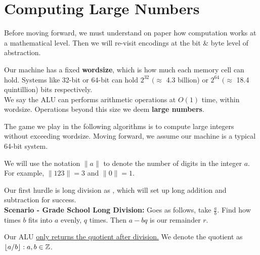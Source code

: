 \section{Computing Large Numbers}
\noindent
Before moving forward, we must understand on paper how computation works at a mathematical level. Then 
we will re-visit encodings at the bit \& byte level of abstraction.

\begin{Def}[Wordsize]

    Our machine has a fixed \textbf{wordsize}, which is how much each memory cell can hold. Systems like 32-bit or 64-bit can hold $2^{32}$ $(\approx$ 4.3 billion) or $2^{64}$ $(\approx$ 18.4 quintillion) bits respectively.\\

    \noindent
    We say the ALU can performs arithmetic operations at $O(1)$ time, within wordsize. Operations beyond this size we deem \textbf{large numbers}.
\end{Def}
\noindent
The game we play in the following algorithms is to compute large integers without exceeding wordsize. Moving forward, we assume our machine is a typical 64-bit system.
\begin{Func}

    \vspace{-.5em}
    We will use the notation $\|a\|$ to denote the number of digits in the integer $a$. For example, $\|123\| = 3$ and $\|0\| = 1$.
\end{Func}

\noindent
Our first hurdle is long division as , which will set up long addition and subtraction for success.\\

\noindent
\textbf{Scenario - Grade School Long Division:} Goes as follows, take $\frac{a}{b}$. Find how times $b$ fits into $a$ evenly, $q$ times. Then $a-bq$ is our remainder $r$.
\begin{Def}

    Our ALU  \underline{only returns the quotient after division.} We denote the quotient as $\floor*{a/b}:a,b\in\Z$.
\end{Def}

